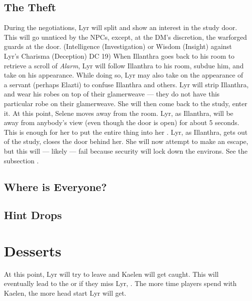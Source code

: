 \documentclass[twocolumn]{dndbook}
\begin{document}
\subsection{The Theft}
During the negotiations, Lyr will split and show an interest in the study door.
This will go unnticed by the NPCs, except, at the DM's discretion, the warforged guards at the door.
(Intelligence (Investigation) or Wisdom (Insight) against Lyr's Charisma (Deception) DC 19)
When Illanthra goes back to his room to retrieve a scroll of \emph{Alarm}, Lyr will follow Illanthra to his room, subdue him, and take on his appearance.
While doing so, Lyr may also take on the appearance of a servant (perhaps Elazti) to confuse Illanthra and others.
Lyr will strip Illanthra, and wear his robes on top of their glamerweave --- they do not have this particular robe on their glamerweave.
She will then come back to the study, enter it. At this point, Selene moves away from the room.
Lyr, as Illanthra, will be away from anybody's view (even though the door is open) for about 5 seconds. This is enough for her to put the entire thing into her .
Lyr, as Illanthra, gets out of the study, closes the door behind her. She will now attempt to make an escape, but this will --- likely --- fail because security will lock down the environs.
See the subsection .


\subsection{Where is Everyone?}
\subsection{Hint Drops}



\section{Desserts}
At this point, Lyr will try to leave and Kaelen will get caught.
This will eventually lead to the  or if they miss Lyr, .
The more time players spend with Kaelen, the more head start Lyr will get.
\end{document}
